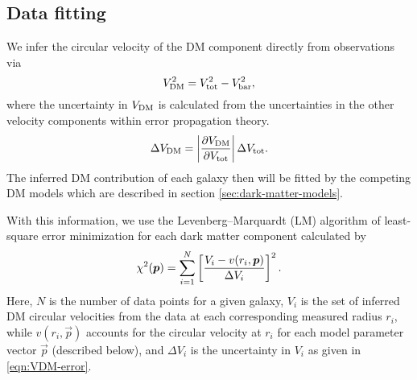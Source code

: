\subsection{Data fitting}
\label{LM-fitting}

We infer the circular velocity of the DM component directly from observations via 
%
\begin{equation}
	\label{eqn:baryonic-diff}
	\SYMvdark^2 = \SYMvtot^2 - \SYMvbar^2,
\end{equation} 
%
where the uncertainty in $V_{\rm DM}$ is calculated from the uncertainties in the other velocity components within  error propagation theory. 
%
\begin{equation}\label{eqn:VDM-error}
    \Delta V_{\rm DM} = \abs{\diffpart{V_{\rm DM}}{V_{\rm tot}}} \Delta V_{\rm tot}.
\end{equation} 
%
The inferred DM contribution of each galaxy then will be fitted by the competing DM models which are described in section \ref{sec:dark-matter-models}.

With this information, we use the Levenberg–Marquardt (LM) algorithm of least-square error minimization for each dark matter component calculated by 
%
\begin{equation}
    \label{eqn:method:chi-square}
	\chi^2(\vec p) = \sum \limits_{i=1}^N \qbracket{\frac{V_i - v(r_i,\vec p)}{\Delta V_{i}}}^2.
\end{equation} 
%
Here, $N$ is the number of data points for a given galaxy, $V_i$ is the set of inferred DM circular velocities from the data at each corresponding measured radius $r_i$, while $v(r_i,\vec p)$ accounts for the circular velocity at $r_i$ for each model parameter vector $\vec p$ (described below), and $\Delta V_{i}$ is the uncertainty in $V_i$ as given in \cref{eqn:VDM-error}.
